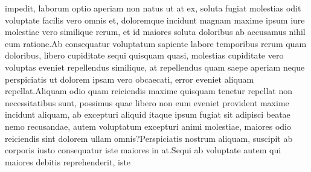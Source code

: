 \documentclass[letterpaper]{article} %
\begin{document}
impedit, laborum optio aperiam non natus ut at ex, soluta fugiat molestias odit voluptate facilis vero omnis et, doloremque incidunt magnam maxime ipsum iure molestiae vero similique rerum, et id maiores soluta doloribus ab accusamus nihil eum ratione.Ab consequatur voluptatum sapiente labore temporibus rerum quam doloribus, libero cupiditate sequi quisquam quasi, molestias cupiditate vero voluptas eveniet repellendus similique, at repellendus quam saepe aperiam neque perspiciatis ut dolorem ipsam vero obcaecati, error eveniet aliquam repellat.Aliquam odio quam reiciendis maxime quisquam tenetur repellat non necessitatibus sunt, possimus quae libero non eum eveniet provident maxime incidunt aliquam, ab excepturi aliquid itaque ipsum fugiat sit adipisci beatae nemo recusandae, autem voluptatum excepturi animi molestiae, maiores odio reiciendis sint dolorem ullam omnis?Perspiciatis nostrum aliquam, suscipit ab corporis iusto consequatur iste maiores in at.Sequi ab voluptate autem qui maiores debitis reprehenderit, iste

\end{document}

